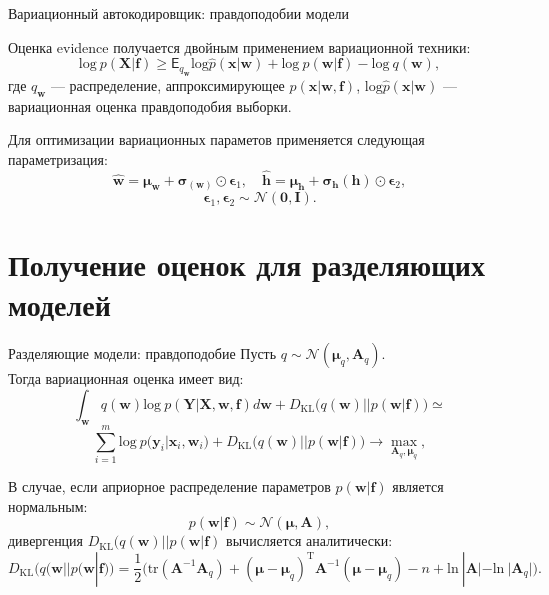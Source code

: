 \documentclass[10pt,pdf,utf8,russian,aspectratio=169]{beamer}
\begin{document}
\begin{frame}{Вариационный автокодировщик: правдоподобии модели}

Оценка evidence получается двойным применением вариационной техники:
$$
\text{log}~p(\mathbf{X}|\mathbf{f}) \geq \mathsf{E}_{q_\mathbf{w}} \text{log}\hat{p}(\mathbf{x}|\mathbf{w}) + \text{log}~p(\mathbf{w}|\mathbf{f}) - \text{log}~q(\mathbf{w}),
$$
где $q_\mathbf{w}$ --- распределение, аппроксимирующее $p(\mathbf{x}|\mathbf{w}, \mathbf{f})$, $ \text{log}\hat{p}(\mathbf{x}|\mathbf{w})$ --- вариационная оценка правдоподобия выборки.

Для оптимизации вариационных параметов применяется следующая параметризация:
$$
\hat{\mathbf{w}} = \boldsymbol{\mu}_\mathbf{w} + \boldsymbol{\sigma}_(\mathbf{w})\odot \boldsymbol{\epsilon}_1,\quad \hat{\mathbf{h}} = \boldsymbol{\mu}_\mathbf{h} + \boldsymbol{\sigma}_\mathbf{h}(\mathbf{h})\odot \boldsymbol{\epsilon}_2, 
$$
$$
\boldsymbol{\epsilon}_1, \boldsymbol{\epsilon}_2 \sim \mathcal{N}(\mathbf{0}, \mathbf{I}).
$$

\end{frame}
\section{Получение оценок для разделяющих моделей}
\begin{frame}{Разделяющие модели: правдоподобие}
Пусть $q \sim \mathcal{N}(\boldsymbol{\mu}_q, \mathbf{A}_q).$\\
Тогда вариационная оценка имеет вид:
$$
\int_{\mathbf{w}} q(\mathbf{w})\text{log}~{p(\mathbf{Y}|\mathbf{X},\mathbf{w},\mathbf{f})} d \mathbf{w} + D_\text{KL}\bigl(q (\mathbf{w} )|| p (\mathbf{w}|\mathbf{f})\bigr) \simeq
$$
$$
\sum_{i=1}^m \text{log}~p(\mathbf{y}_i|\mathbf{x}_i, \mathbf{w}_i) + D_\text{KL}\bigl(q (\mathbf{w} )|| p (\mathbf{w}|\mathbf{f})\bigr) \to \max_{\mathbf{A}_q, \boldsymbol{\mu}_q},
$$

В случае, если априорное распределение параметров $p(\mathbf{w}|\mathbf{f})$ является нормальным: 
$$
p(\mathbf{w}|\mathbf{f}) \sim \mathcal{N}(\boldsymbol{\mu}, \mathbf{A}),
$$
дивергенция $D_\text{KL}\bigl(q (\mathbf{w} )|| p (\mathbf{w}|\mathbf{f})$ вычисляется аналитически:
$$
D_\text{KL}\bigl(q (\mathbf{w} || p (\mathbf{w}|\mathbf{f})\bigr) = \frac{1}{2} \bigl( \text{tr} (\mathbf{A}^{-1}\mathbf{A}_q) + (\boldsymbol{\mu} - \boldsymbol{\mu}_q)^\text{T}\mathbf{A}^{-1}(\boldsymbol{\mu} - \boldsymbol{\mu}_q) - n +\text{ln}~|\mathbf{A}| - \text{ln}~|\mathbf{A}_q| \bigr).
$$
\end{frame}
\end{document}
